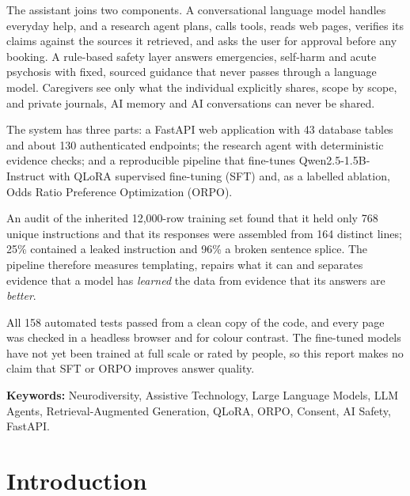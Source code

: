 \documentclass[11pt,a4paper]{article}
\begin{document}
The assistant joins two components. A conversational language model handles everyday help, and
a research agent plans, calls tools, reads web pages, verifies its claims against the sources
it retrieved, and asks the user for approval before any booking. A rule-based safety layer answers
emergencies, self-harm and acute psychosis with fixed, sourced guidance that never passes
through a language model. Caregivers see only what the individual explicitly shares, scope by scope,
and private journals, AI memory and AI conversations can never be shared.

The system has three parts: a FastAPI web application with 43 database tables and about 130
authenticated endpoints; the research agent with deterministic evidence checks; and a
reproducible pipeline that fine-tunes Qwen2.5-1.5B-Instruct with QLoRA supervised fine-tuning
(SFT) and, as a labelled ablation, Odds Ratio Preference Optimization (ORPO).

An audit of the inherited 12,000-row training set found that it held only 768 unique
instructions and that its responses were assembled from 164 distinct lines; 25\% contained a
leaked instruction and 96\% a broken sentence splice. The pipeline therefore measures templating,
repairs what it can and separates evidence that a model has \emph{learned} the data from evidence
that its answers are \emph{better}.

All 158 automated tests passed from a clean copy of the code, and every page was checked in a headless
browser and for colour contrast. The fine-tuned models have not yet been trained at full scale or rated by
people, so this report makes no claim that SFT or ORPO improves answer quality.

\textbf{Keywords:} Neurodiversity, Assistive Technology, Large Language Models, LLM Agents,
Retrieval-Augmented Generation, QLoRA, ORPO, Consent, AI Safety, FastAPI.

\clearpage
{}
\tableofcontents
\clearpage
{}
\listoffigures
\listoftables
\lstlistoflistings
\clearpage

\setcounter{page}{1}

\section{Introduction}
\end{document}
